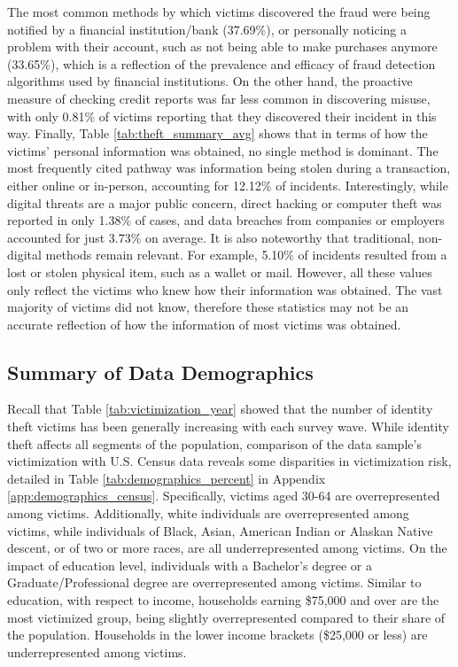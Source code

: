 The most common methods by which victims discovered the fraud were being notified by a financial institution/bank (37.69\%), or personally noticing a problem with their account, such as not being able to make purchases anymore (33.65\%), which is a reflection of the prevalence and efficacy of fraud detection algorithms used by financial institutions. On the other hand, the proactive measure of checking credit reports was far less common in discovering misuse, with only 0.81\% of victims reporting that they discovered their incident in this way. Finally, Table \ref{tab:theft_summary_avg} shows that in terms of how the victims' personal information was obtained, no single method is dominant. The most frequently cited pathway was information being stolen during a transaction, either online or in-person, accounting for 12.12\% of incidents. Interestingly, while digital threats are a major public concern, direct hacking or computer theft was reported in only 1.38\% of cases, and data breaches from companies or employers accounted for just 3.73\% on average. It is also noteworthy that traditional, non-digital methods remain relevant. For example, 5.10\% of incidents resulted from a lost or stolen physical item, such as a wallet or mail. However, all these values only reflect the victims who knew how their information was obtained. The vast majority of victims did not know, therefore these statistics may not be an accurate reflection of how the information of most victims was obtained.





\subsection{Summary of Data Demographics}

Recall that Table \ref{tab:victimization_year} showed that the number of identity theft victims has been generally increasing with each survey wave. While identity theft affects all segments of the population, comparison of the data sample's victimization with U.S. Census data reveals some disparities in victimization risk, detailed in Table \ref{tab:demographics_percent} in Appendix \ref{app:demographics_census}. Specifically, victims aged 30-64 are overrepresented among victims. Additionally, white individuals are overrepresented among victims, while  individuals of Black, Asian, American Indian or Alaskan Native descent, or of two or more races, are all underrepresented among victims. On the impact of education level, individuals with a Bachelor's degree or a Graduate/Professional degree are overrepresented among victims. Similar to education, with respect to income, households earning \$75,000 and over are the most victimized group, being slightly overrepresented compared to their share of the population. Households in the lower income brackets (\$25,000 or less) are underrepresented among victims. 

